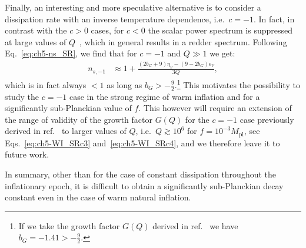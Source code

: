 Finally, an interesting and more speculative alternative is to consider a dissipation rate with an inverse temperature dependence, i.e.\ $c=-1$. In fact, in contrast with the $c>0$ cases, for $c<0$ the scalar power spectrum is suppressed at large values of $Q$~\cite{Bastero-Gil:2011rva}, which in general results in a redder spectrum. Following Eq.~\ref{eq:ch5-ns_SR}, we find that for $c=-1$ and $Q\gg 1$ we get:
\begin{align}
    n_{s,-1}&\approx 1+ \frac{(2b_G+9)\eta_V -(9-2b_G)\epsilon_V}{3Q}, \label{eq:ch5-ns_c-1}
\end{align}
which is in fact always $<1$ as long as $b_G>-\frac{9}{2}$.\footnote{If we take the growth factor $G(Q)$ derived in ref.~\cite{Motaharfar:2018zyb} we have $b_G=-1.41>-\frac{9}{2}$.} This motivates the possibility to study the $c=-1$ case in the strong regime of warm inflation and for a significantly sub-Planckian value of $f$. This however will require an extension of the range of validity of the growth factor $G(Q)$ for the $c=-1$ case previously derived in ref.~\cite{Motaharfar:2018zyb} to larger values of $Q$, i.e.\ $Q\gtrsim 10^{6}$ for $f=10^{-3}M_\mathrm{pl}$, see Eqs.~\ref{eq:ch5-WI_SRc3} and~\ref{eq:ch5-WI_SRc4}, and we therefore leave it to future work.

In summary, other than for the case of constant dissipation throughout the inflationary epoch, it is difficult to obtain a significantly sub-Planckian decay constant even in the case of warm natural inflation.

